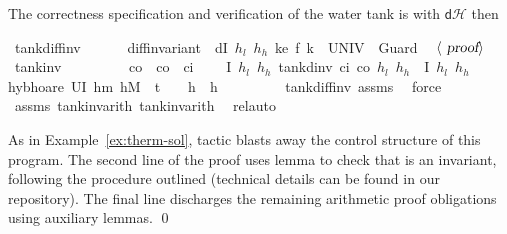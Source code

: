 \documentclass[envcountsame,envcountsect]{llncs}
\newcommand{\dH}{\mathsf{d}\mathcal{H}}
\begin{document}
\begin{example}
\noindent The correctness specification and verification of the water
tank is with $\dH$ then

\begin{isabellebody}
\isanewline
{}\isamarkupfalse%
\ tank{\isacharunderscore}diff{\isacharunderscore}inv{\isacharcolon}\isanewline
\ \ {\isachardoublequoteopen}{}\ {\isasymle}\ {\isasymtau}\ {\isasymLongrightarrow}\ diff{\isacharunderscore}invariant\ \ {\isasymlbrakk}dI\ $h_l$\ $h_h$\ k{\isasymrbrakk}\isactrlsub e\ {\isacharparenleft}f\ k{\isacharparenright}\ {\isacharbraceleft}{}{\isachardot}{\isachardot}{\isasymtau}{\isacharbraceright}\ UNIV\ {}\ Guard{\isachardoublequoteclose}\isanewline
\ \ $\langle \isa{proof}\rangle$\isanewline
\isanewline
{}\isamarkupfalse%
\ tank{\isacharunderscore}inv{\isacharcolon}\isanewline
\ \ \ {\isachardoublequoteopen}{}\ {\isasymle}\ {\isasymtau}{\isachardoublequoteclose}\ \ {\isachardoublequoteopen}{}\ {\isacharless}\ c\isactrlsub o{\isachardoublequoteclose}\ \ {\isachardoublequoteopen}c\isactrlsub o\ {\isacharless}\ c\isactrlsub i{\isachardoublequoteclose}\isanewline
\ \ \ {\isachardoublequoteopen}\ \isactrlbold {\isacharbraceleft}I\ $h_l$\ $h_h$\isactrlbold {\isacharbraceright}\ tank{\isacharunderscore}dinv\ c\isactrlsub i\ c\isactrlsub o\ $h_l$\ $h_h$\ {\isasymtau}\ \isactrlbold {\isacharbraceleft}I\ $h_l$\ $h_h$\isactrlbold {\isacharbraceright}{\isachardoublequoteclose}\isanewline
\ \ \isamarkupfalse%
{\isacharparenleft}hyb{\isacharunderscore}hoare\ {\isachardoublequoteopen}U{\isacharparenleft}I\ h\isactrlsub m\ h\isactrlsub M\ {\isasymand}\ t\ {\isacharequal}\ {}\ {\isasymand}\ h\ {\isacharequal}\ h{\isacharparenright}{\isachardoublequoteclose}{\isacharparenright}\isanewline
\ \ \isamarkupfalse%
\ {}\ \isamarkupfalse%
\ {}\ \isamarkupfalse%
\ tank{\isacharunderscore}diff{\isacharunderscore}inv\ assms\ \isamarkupfalse%
\ force{\isacharplus}\isanewline
\ \ \isamarkupfalse%
\ assms\ tank{\isacharunderscore}inv{\isacharunderscore}arith{}\ tank{\isacharunderscore}inv{\isacharunderscore}arith{}\ \isamarkupfalse%
\ rel{\isacharunderscore}auto{\isacharprime}\isanewline
\end{isabellebody}

\noindent As in Example~\ref{ex:therm-sol}, tactic  blasts away
the control structure of this program. The second line of the proof
uses lemma  to check that  is an invariant,
following the procedure outlined (technical details can be found in
our repository). The final line discharges the remaining arithmetic
proof obligations using auxiliary lemmas. 
\qed
\end{example}
\end{document}
